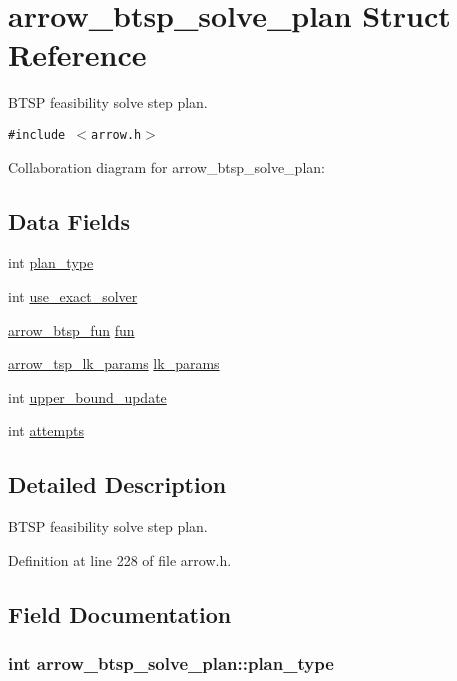 \hypertarget{structarrow__btsp__solve__plan}{
\section{arrow\_\-btsp\_\-solve\_\-plan Struct Reference}
\label{structarrow__btsp__solve__plan}
}
BTSP feasibility solve step plan.  


{\tt \#include $<$arrow.h$>$}

Collaboration diagram for arrow\_\-btsp\_\-solve\_\-plan:\subsection*{Data Fields}
\begin{CompactItemize}
\item 
int \hyperlink{structarrow__btsp__solve__plan_527ebf95b7a2c12f174d935ded4445a9}{plan\_\-type}
\item 
int \hyperlink{structarrow__btsp__solve__plan_fed81dda6e547af712c67dc2c35b55b3}{use\_\-exact\_\-solver}
\item 
\hyperlink{structarrow__btsp__fun}{arrow\_\-btsp\_\-fun} \hyperlink{structarrow__btsp__solve__plan_89fa2ad1bcc026cd50fd7abc6c30ce3e}{fun}
\item 
\hyperlink{structarrow__tsp__lk__params}{arrow\_\-tsp\_\-lk\_\-params} \hyperlink{structarrow__btsp__solve__plan_576ea43a6d1de8f9c46f02edf2849122}{lk\_\-params}
\item 
int \hyperlink{structarrow__btsp__solve__plan_5ac6a38c297df040797c63babc4c02c3}{upper\_\-bound\_\-update}
\item 
int \hyperlink{structarrow__btsp__solve__plan_acfa3d4257a33548a9f60ee568219bc5}{attempts}
\end{CompactItemize}


\subsection{Detailed Description}
BTSP feasibility solve step plan. 

Definition at line 228 of file arrow.h.

\subsection{Field Documentation}
\hypertarget{structarrow__btsp__solve__plan_527ebf95b7a2c12f174d935ded4445a9}{
\subsubsection{\setlength{\rightskip}{0pt plus 5cm}int {\bf arrow\_\-btsp\_\-solve\_\-plan::plan\_\-type}}}
\label{structarrow__btsp__solve__plan_527ebf95b7a2c12f174d935ded4445a9}


